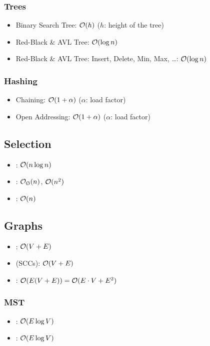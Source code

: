 \documentclass{article}
\begin{document}
\subsubsection{Trees}
\begin{itemize}
  \item Binary Search Tree: $\mathcal{O}(h)$ ($h$: height of the tree)
  \item Red-Black \& AVL Tree: $\mathcal{O}(\log n)$
  \item Red-Black \& AVL Tree: Insert, Delete, Min, Max, …: $\mathcal{O}(\log n)$
\end{itemize}
\subsubsection{Hashing}
\begin{itemize}
  \item Chaining: $\mathcal{O}(1+\alpha)$ ($\alpha$: load factor)
  \item Open Addressing: $\mathcal{O}(1+\alpha)$ ($\alpha$: load factor)
\end{itemize}

\subsection{Selection}
\begin{itemize}
  \item {}: $\mathcal{O}(n\log n)$
  \item {}: $\bigO_\text{\O}(n)$, $\mathcal{O}(n^2)$
  \item {}: $\mathcal{O}(n)$
\end{itemize}

\subsection{Graphs}
\begin{itemize}
  \item {}: $\mathcal{O}(V+E)$
  \item {} (SCCs): $\mathcal{O}(V+E)$
  \item {}: $\mathcal{O}(E(V+E))=\mathcal{O}(E\cdot V+E^2)$
\end{itemize}
\subsubsection{MST}
\begin{itemize}
  \item {}: $\mathcal{O}(E\log V)$
  \item {}: $\mathcal{O}(E\log V)$
\end{itemize}
\end{document}
